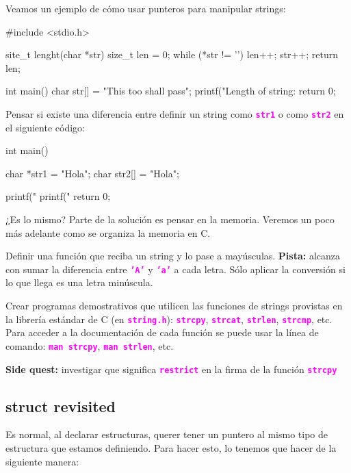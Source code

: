 \documentclass[]{scrartcl}
\newcommand{\hl}[1]{\textcolor{magenta}{\textbf{\texttt{#1}}}}
\begin{document}
Veamos un ejemplo de cómo usar punteros para manipular strings:

\begin{cbox}[]{}
  #include <stdio.h>

  site_t lenght(char *str) {
      size_t len = 0;
      while (*str != '\0') {
          len++;
          str++;
      }
      return len;
  }

  int main() {
      char str[] = "This too shall pass";
      printf("Length of string: %
    return 0;
  }
\end{cbox}

\begin{exbox}
Pensar si existe una diferencia entre definir un string como \hl{str1} o como \hl{str2} en el siguiente código:
\begin{cbox}[]{}
  int main(){
    char *str1 = "Hola";
    char str2[] = "Hola";

    printf("%
    printf("%
    return 0;
  }
  
\end{cbox}

¿Es lo mismo? Parte de la solución es pensar en la memoria. Veremos un poco más adelante como se organiza la memoria en C.
\end{exbox}

\begin{exbox}
Definir una función que reciba un string y lo pase a mayúsculas. \textbf{Pista:} alcanza con sumar la diferencia entre \hl{'A'} y \hl{'a'} a cada letra. Sólo aplicar la conversión si lo que llega es una letra minúscula. 
\end{exbox}

\begin{exbox}
Crear programas demostrativos que utilicen las funciones de strings provistas en la librería estándar de C (en \hl{string.h}): \hl{strcpy}, \hl{strcat}, \hl{strlen}, \hl{strcmp}, etc. Para acceder a la documentación de cada función se puede usar la línea de comando: \hl{man strcpy}, \hl{man strlen}, etc. 

\textbf{Side quest:} investigar que significa \hl{restrict} en la firma de la función \hl{strcpy}
\end{exbox}

\newpage
\subsection*{struct revisited}

Es normal, al declarar estructuras, querer tener un puntero al mismo tipo de estructura que estamos definiendo. Para hacer esto, lo tenemos que hacer de la siguiente manera:
\end{document}
